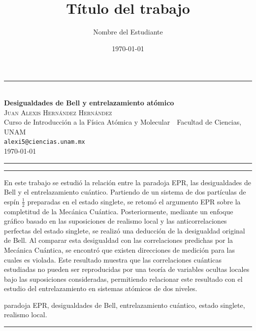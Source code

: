 \documentclass[11pt,letterpaper]{article}
\title{Título del trabajo}
\author{Nombre del Estudiante}
\date{\today}
\newcommand{\subtitulo}{Subtítulo opcional del trabajo}
\begin{document}
\begin{center}
  {\color{ocre}\rule{0.5\textwidth}{0.8pt}}\\[1.1em]
  {\LARGE\bfseries\color{navaMidnight} Desigualdades de Bell y entrelazamiento atómico}\\[0.45em]
  {\scshape\large Juan Alexis Hernández Hernández}\\[0.35em]
  {\small Curso de Introducción a la Física Atómica y Molecular\ \textperiodcentered\ Facultad de Ciencias, UNAM\\
   \texttt{alexi5@ciencias.unam.mx}}\\[0.5em]
  {\small \today}\\[0.6em]
  {\color{ocre}\rule{0.5\textwidth}{0.8pt}}
\end{center}
\vspace{0.6em}

\begin{center}
\begin{minipage}{0.88\textwidth}
  {\color{adobe}\rule{\linewidth}{0.6pt}}\par\vspace{0.6em}
  \small
  	En este trabajo se estudió la relación entre la paradoja EPR, las desigualdades de Bell y el entrelazamiento cuántico. Partiendo de un sistema de dos partículas de espín $\frac{1}{2}$ preparadas en el estado singlete, se retomó el argumento EPR sobre la completitud de la Mecánica Cuántica. Posteriormente, mediante un enfoque gráfico basado en las suposiciones de realismo local y las anticorrelaciones perfectas del estado singlete, se realizó una deducción de la desigualdad original de Bell. Al comparar esta desigualdad con las correlaciones predichas por la Mecánica Cuántica, se encontró que existen direcciones de medición para las cuales es violada. Este resultado muestra que las correlaciones cuánticas estudiadas no pueden ser reproducidas por una teoría de variables ocultas locales bajo las suposiciones consideradas, permitiendo relacionar este resultado con el estudio del entrelazamiento en sistemas atómicos de dos niveles.
  
  \par\vspace{0.7em}
   paradoja EPR, desigualdades de Bell, entrelazamiento cuántico, estado singlete, realismo local. %
  \par\vspace{0.6em}
  {\color{adobe}\rule{\linewidth}{0.6pt}}
\end{minipage}
\end{center}
\vspace{1.2em}
\end{document}
